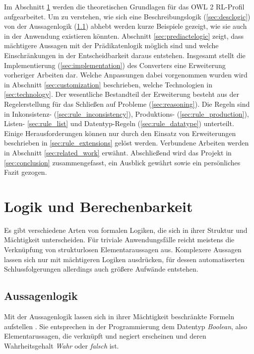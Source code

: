 \documentclass[runningheads,a4paper]{llncs}
\begin{document}
Im Abschnitt \ref{sec:logic} werden die theoretischen Grundlagen für das OWL 2 RL-Profil aufgearbeitet. 
Um zu verstehen, wie sich eine Beschreibungslogik (\ref{sec:desclogic}) von der Aussagenlogik (\ref{sec:aussagenlogik}) abhebt werden kurze Beispiele gezeigt, wie sie auch in der Anwendung existieren könnten.
Abschnitt \ref{sec:prediactelogic} zeigt, dass mächtigere Aussagen mit der Prädikatenlogik möglich sind und welche Einschränkungen in der Entscheidbarkeit daraus entstehen.
Insgesamt stellt die Implementierung (\ref{sec:implementation}) des Converters eine Erweiterung vorheriger Arbeiten dar.
Welche Anpassungen dabei vorgenommen wurden wird in Abschnitt \ref{sec:customization} beschrieben, welche Technologien in \ref{sec:technology}.
Der wesentliche Bestandteil der Erweiterung besteht aus der Regelerstellung für das Schließen auf Probleme (\ref{sec:reasoning}).
Die Regeln sind in Inkonsistenz- (\ref{sec:rule_inconsistency}), Produktions- (\ref{sec:rule_production}), Listen- \ref{sec:rule_list} und Datentyp-Regeln (\ref{sec:rule_datatype}) unterteilt.
Einige Herausforderungen können nur durch den Einsatz von Erweiterungen beschrieben in \ref{sec:rule_extensions} gelöst werden.
Verbundene Arbeiten werden in Abschnitt \ref{sec:related_work} erwähnt.
Abschließend wird das Projekt in \ref{sec:conclusion} zusammengefasst, ein Ausblick gewährt sowie ein persönliches Fazit gezogen.

\newpage
\section{Logik und Berechenbarkeit}
\label{sec:logic}

Es gibt verschiedene Arten von formalen Logiken, die sich in ihrer Struktur und Mächtigkeit unterscheiden.
Für triviale Anwendungsfälle reicht meistens die Verknüpfung von strukturlosen Elementaraussagen aus.
Komplexere Aussagen lassen sich nur mit mächtigeren Logiken ausdrücken, für dessen automatiserten Schlussfolgerungen allerdings auch größere Aufwände entstehen.

\subsection{Aussagenlogik}
\label{sec:aussagenlogik}

Mit der Aussagenlogik lassen sich in ihrer Mächtigkeit beschränkte Formeln aufstellen \cite[p. 6,373]{foundations}. Sie entsprechen in der Programmierung dem Datentyp \textit{Boolean}, also Elementarussagen, die verknüpft und negiert erscheinen und deren Wahrheitsgehalt \textit{Wahr} oder \textit{falsch} ist.
\end{document}
